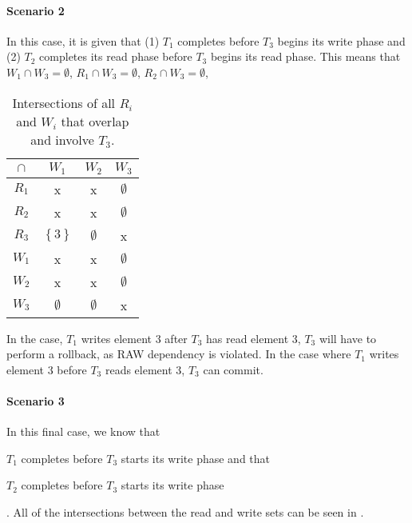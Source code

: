 \documentclass[11pt,a4paper,english]{article}
\begin{document}
\paragraph{Scenario 2} In this case, it is given that (1) $T_{1}$ completes
before $T_{3}$ begins its write phase and (2) $T_{2}$ completes its read phase
before $T_{3}$ begins its read phase. This means that
$W_{1} \cap W_{3} = \emptyset$, $R_{1} \cap W_{3} = \emptyset$,
$R_{2} \cap W_{3} = \emptyset$,
\begin{table}[!hbt]
\centering
\begin{tabular}{|c|c|c|c|}
\hline
$\cap$  & $W_{1}$ & $W_{2}$ & $W_{3}$    \\ \hline
$R_{1}$ & x  & x  & $\emptyset$ \\ \hline
$R_{2}$ & x  & x  & $\emptyset$ \\ \hline
$R_{3}$ & $\left\{ 3 \right\}$ & $\emptyset$ & x \\ \hline
$W_{1}$ & x  & x  & $\emptyset$ \\ \hline
$W_{2}$ & x  & x  & $\emptyset$ \\ \hline
$W_{3}$ & $\emptyset$ & $\emptyset$ & x \\ \hline
\end{tabular}
\caption{Intersections of all $R_{i}$ and $W_{i}$ that overlap and involve $T_{3}$.}
\label{tbl:scenario1}
\end{table}

In the case, $T_{1}$ writes element $3$ after $T_{3}$ has read element $3$,
$T_{3}$ will have to perform a rollback, as RAW dependency is violated. In the
case where $T_{1}$ writes element $3$ before $T_{3}$ reads element $3$, $T_{3}$
can commit.

\paragraph{Scenario 3}
In this final case, we know that \begin{inparaenum}[1)] \item $T_1$ completes before
  $T_3$ starts its write phase and that \item $T_2$ completes before $T_3$
  starts its write phase \end{inparaenum}. All of the intersections between the
read and write sets can be seen in .
\end{document}
